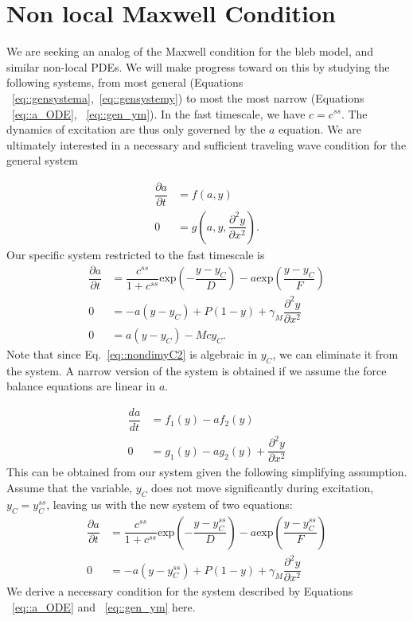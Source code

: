 \section{Non local Maxwell Condition}



We are seeking an analog of the Maxwell condition for the bleb model, and similar non-local PDEs. We will make progress toward on this by studying the following systems, from most general (Equations ~\ref{eq::gensystema},~\ref{eq::gensystemy})  to most the most narrow (Equations ~\ref{eq::a_ODE}, ~\ref{eq::gen_ym}).  In the fast timescale, we have $c = c^{ss}$.  The dynamics of excitation are thus only governed by the $a$ equation. We are ultimately interested in a necessary and sufficient traveling wave condition for the general system

\begin{align}
\dfrac{\partial a}{ \partial t}  & =  f(a,y)\label{eq::gensystema}\\
0 & =g \left(a,y,\dfrac{\partial^2 y}{\partial x^2}\right). \label{eq::gensystemy}
\end{align}
Our specific system restricted to the fast timescale is
\begin{align}
\dfrac{\partial a}{ \partial t}  & =  \dfrac{c^{ss}}{1+c^{ss}} \mbox{exp}\left(-\dfrac{y-y_C}{D}\right) - a \mbox{exp} \left(\dfrac{y-y_C}{F} \right)\label{eq::a_ODE}\\
0 & = -a(y - y_C) + P (1-y) + \gamma_M \dfrac{\partial^2 y}{\partial x^2}\label{eq::yM_eq} \\
0 & = a(y-y_C) - Mcy_C\label{eq::nondimyC2}.
\end{align} 
Note that since Eq.~\ref{eq::nondimyC2} is algebraic in $y_C$, we can eliminate it from the system. A narrow version of the system is obtained if we assume the force balance equations are linear in $a$.

\begin{align}
\dfrac{da}{ dt}  & = f_1(y) - a f_2(y)\label{eq::gen_a}\\
0 & = g_1(y) - ag_2(y) +  \dfrac{\partial^2 y}{\partial x^2}\label{eq::gen_ym}
\end{align}
This can be obtained from our system given the following simplifying assumption. Assume that the variable, $y_C$ does not move significantly during excitation, $y_C = y_C^{ss}$, leaving us with the new system of two equations:
\begin{align}
\dfrac{\partial a}{ \partial t}  & =  \dfrac{c^{ss}}{1+c^{ss}} \mbox{exp}\left(-\dfrac{y-y_C^{ss}}{D}\right) - a \mbox{exp} \left(\dfrac{y-y_C^{ss}}{F} \right)\label{eq::a_ODE}\\
0 & = -a(y - y_C^{ss}) + P (1-y) + \gamma_M \dfrac{\partial^2 y}{\partial x^2}\label{eq::yM_eq}
\end{align} 
We derive a necessary condition for the system described by Equations ~\ref{eq::a_ODE} and ~\ref{eq::gen_ym} here. 

